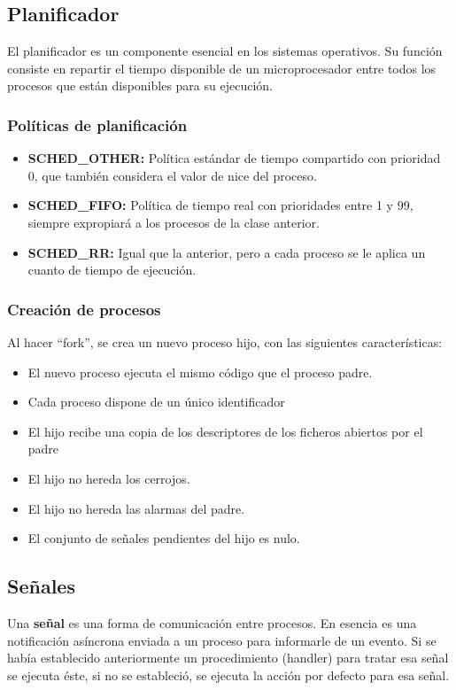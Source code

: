 \subsection{Planificador}
El planificador es un componente esencial en los sistemas operativos. Su función consiste en repartir el tiempo disponible de un microprocesador entre todos los procesos que están disponibles para su ejecución.\\

\subsubsection{Políticas de planificación}
\begin{itemize}
    \item \textbf{SCHED\_OTHER: }Política estándar de tiempo compartido con prioridad 0, que también considera el valor de nice del proceso.
    \item \textbf{SCHED\_FIFO: }Política de tiempo real con prioridades entre 1 y 99, siempre expropiará a los procesos de la clase anterior.
    \item \textbf{SCHED\_RR: }Igual que la anterior, pero a cada proceso se le aplica un cuanto de tiempo de ejecución.
\end{itemize}
\subsubsection{Creación de procesos}
Al hacer \enquote{fork}, se crea un nuevo proceso hijo, con las siguientes características:
\begin{itemize}
    \item El nuevo proceso ejecuta el mismo código que el proceso padre.
    \item Cada proceso dispone de un único identificador
    \item El hijo recibe una copia de los descriptores de los ficheros abiertos por el padre 
    \item El hijo no hereda los cerrojos.
    \item El hijo no hereda las alarmas del padre.
    \item El conjunto de señales pendientes del hijo es nulo.
\end{itemize}
\subsection{Señales}
Una \textbf{señal} es una forma de comunicación entre procesos. En esencia es una notificación asíncrona enviada a un proceso para informarle de un evento. Si se había establecido anteriormente un procedimiento (handler) para tratar esa señal se ejecuta éste, si no se estableció, se ejecuta la acción por defecto para esa señal.
